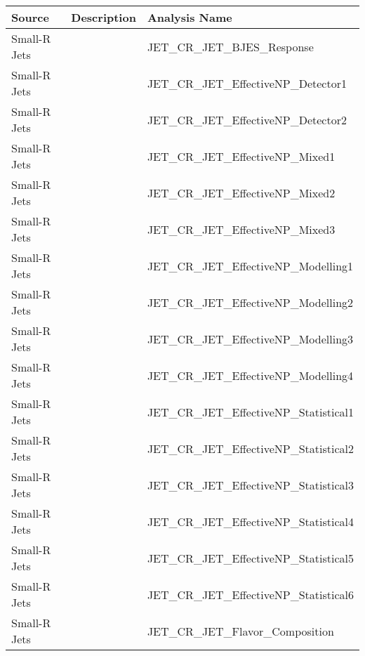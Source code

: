 \begin{table}[!hp]
  \centering
  \footnotesize
  \begin{center}
    \begin{tabular}{|l|l|l|}
      \hline
      Source        & Description                     & Analysis Name                                       \\ \hline
      Small-R Jets  &             &  JET\_CR\_JET\_BJES\_Response                            \\
      Small-R Jets  &             &  JET\_CR\_JET\_EffectiveNP\_Detector1                    \\
      Small-R Jets  &             &  JET\_CR\_JET\_EffectiveNP\_Detector2                    \\
      Small-R Jets  &             &  JET\_CR\_JET\_EffectiveNP\_Mixed1                       \\
      Small-R Jets  &             &  JET\_CR\_JET\_EffectiveNP\_Mixed2                       \\
      Small-R Jets  &             &  JET\_CR\_JET\_EffectiveNP\_Mixed3                       \\
      Small-R Jets  &             &  JET\_CR\_JET\_EffectiveNP\_Modelling1                   \\
      Small-R Jets  &             &  JET\_CR\_JET\_EffectiveNP\_Modelling2                   \\
      Small-R Jets  &             &  JET\_CR\_JET\_EffectiveNP\_Modelling3                   \\
      Small-R Jets  &             &  JET\_CR\_JET\_EffectiveNP\_Modelling4                   \\
      Small-R Jets  &             &  JET\_CR\_JET\_EffectiveNP\_Statistical1                 \\
      Small-R Jets  &             &  JET\_CR\_JET\_EffectiveNP\_Statistical2                 \\
      Small-R Jets  &             &  JET\_CR\_JET\_EffectiveNP\_Statistical3                 \\
      Small-R Jets  &             &  JET\_CR\_JET\_EffectiveNP\_Statistical4                 \\
      Small-R Jets  &             &  JET\_CR\_JET\_EffectiveNP\_Statistical5                 \\
      Small-R Jets  &             &  JET\_CR\_JET\_EffectiveNP\_Statistical6                 \\
      Small-R Jets  &             &  JET\_CR\_JET\_Flavor\_Composition                       \\

\end{tabular}
\end{center}
\end{table}

